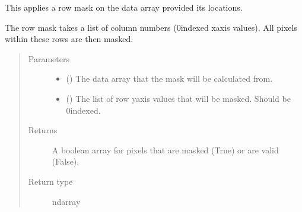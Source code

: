 \documentclass[letterpaper,10pt,english]{sphinxmanual}
\begin{document}

\begin{fulllineitems}
\label{\detokenize{docstrings/ifa_smeargle.masking.geometric:ifa_smeargle.masking.geometric.mask_rows}}
This applies a row mask on the data array provided its
locations.

The row mask takes a list of column numbers (0\sphinxhyphen{}indexed x\sphinxhyphen{}axis
values). All pixels within these rows are then masked.
\begin{quote}\begin{description}
\item[{Parameters}] \leavevmode\begin{itemize}
\item {} 
 () \textendash{} The data array that the mask will be calculated from.

\item {} 
 () \textendash{} The list of row y\sphinxhyphen{}axis values that will be masked. Should be
0\sphinxhyphen{}indexed.

\end{itemize}

\item[{Returns}] \leavevmode
{} \textendash{} A boolean array for pixels that are masked (True) or are
valid (False).

\item[{Return type}] \leavevmode
ndarray

\end{description}\end{quote}

\end{fulllineitems}

\end{document}
